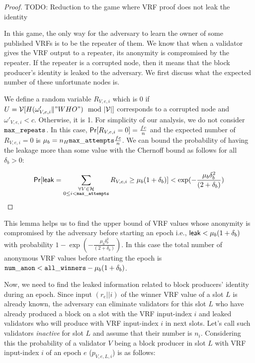 \begin{proof}
	
	TODO: Reduction to the game where VRF proof does not leak the identity
	
	In this game, the only way for the adversary to learn the owner of some published VRFs is to be the repeater of them. We know that when a validator gives the VRF output to a repeater, its anonymity is compromised by the repeater. If the repeater is a corrupted node, then it means that the block producer's identity is leaked to the adversary. We first discuss what the expected number of these unfortunate nodes is. 
	
	
	We define a random variable $ R_{V,e,i} $ which is 0 if $ U = \mathcal{V}[H(\omega'_{V,e,i} \| "WHO") \mod |\mathcal{V}|]  $ corresponds to a corrupted node and $ \omega'_{V,e,i} < c $. Otherwise, it is 1. For simplicity of our analysis, we do not consider $ \mathtt{max\_repeats} $. In this case, $ \mathsf{Pr}[R_{V,e,i} = 0] = \frac{fc}{n} $ and
	the expected number of $ R_{V,e,i}  = 0$ is  $ \mu_b = n_H \mathtt{max\_attempts} \frac{fc}{n} $. We can bound the probability of having the leakage more than some value with the Chernoff bound as follows for all $ \delta_b > 0 	 $:
	
	\begin{equation}\label{eq:beforeepcoh}
	\mathsf{Pr}[\mathsf{leak} = \sum_{\substack{ \forall V \in \mathcal{H} \\0\leq i < \mathtt{max\_attempts}}} R_{V,e,i} \geq \mu_b (1+ \delta_b)] < \exp(-\frac{\mu_b\delta_b^2}{(2+\delta_b)}) \nonumber
	\end{equation}
	
	
\end{proof}


This lemma helps us to find the upper bound of VRF values whose anonymity is compromised by the adversary before starting an epoch i.e., $ \mathsf{leak} < \mu_b (1+ \delta_b) $ with probability $ 1- \exp(-\frac{\mu_b\delta_b^2}{(2+\delta_b)}) $. In this case the total number of anonymous VRF values before starting the epoch is $  \mathtt{num\_anon} < \mathtt{all\_winners} - \mu_b (1+\delta_b)$.

Now, we need to find the leaked information related to block producers' identity during an epoch. 
Since input $ (r_e||i) $ of the winner VRF value of a slot $ L $ is already known, the adversary can eliminate validators for this slot $ L $ who have already produced a block on a slot with the VRF input-index $ i $ and leaked validators who will produce with VRF input-index $ i $ in next slots. Let's call such validators \emph{inactive} for slot $ L $ and assume that their number is $ n_i $. Considering this the probability of a validator $ V $ being a block producer in slot $ L $ with VRF input-index $ i $ of an epoch $ e $ ($ p_{V,e, L, i} $)  is as follows:

